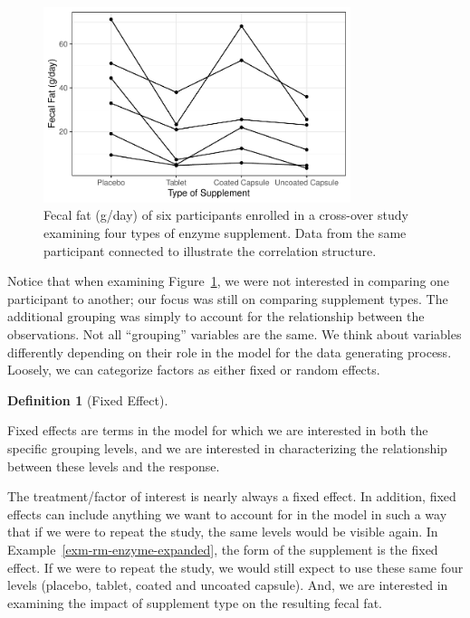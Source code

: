 \documentclass[
  letterpaper,
  DIV=11,
  numbers=noendperiod]{scrreprt}
\theoremstyle{definition}
\newtheorem{definition}{Definition}[chapter]
\theoremstyle{definition}
\theoremstyle{remark}
\begin{document}
\begin{figure}

{\centering \includegraphics[width=0.8\textwidth,height=\textheight]{./images/fig-rm-terminology-enzyme-plot-expanded-1.pdf}

}

\caption{\label{fig-rm-terminology-enzyme-plot-expanded}Fecal fat
(g/day) of six participants enrolled in a cross-over study examining
four types of enzyme supplement. Data from the same participant
connected to illustrate the correlation structure.}

\end{figure}

Notice that when examining
Figure~\ref{fig-rm-terminology-enzyme-plot-expanded}, we were not
interested in comparing one participant to another; our focus was still
on comparing supplement types. The additional grouping was simply to
account for the relationship between the observations. Not all
``grouping'' variables are the same. We think about variables
differently depending on their role in the model for the data generating
process. Loosely, we can categorize factors as either fixed or random
effects.

\begin{definition}[Fixed
Effect]\protect\hypertarget{def-fixed-effect}{}\label{def-fixed-effect}

Fixed effects are terms in the model for which we are interested in both
the specific grouping levels, and we are interested in characterizing
the relationship between these levels and the response.

\end{definition}

The treatment/factor of interest is nearly always a fixed effect. In
addition, fixed effects can include anything we want to account for in
the model in such a way that if we were to repeat the study, the same
levels would be visible again. In Example~\ref{exm-rm-enzyme-expanded},
the form of the supplement is the fixed effect. If we were to repeat the
study, we would still expect to use these same four levels (placebo,
tablet, coated and uncoated capsule). And, we are interested in
examining the impact of supplement type on the resulting fecal fat.
\end{document}
